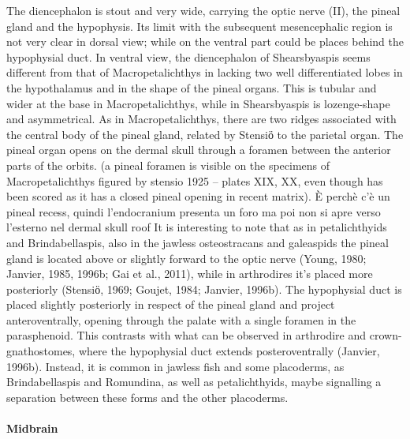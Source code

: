 \documentclass[12pt,letterpaper]{article}
\begin{document}
The diencephalon is stout and very wide, carrying the optic nerve (II), the pineal gland and the hypophysis. Its limit with the subsequent mesencephalic region is not very clear in dorsal view; while on the ventral part could be places behind the hypophysial duct. In ventral view, the diencephalon of Shearsbyaspis seems different from that of Macropetalichthys in lacking two well differentiated lobes in the hypothalamus and in the shape of the pineal organs. This is tubular and wider at the base in Macropetalichthys, while in Shearsbyaspis is lozenge-shape and asymmetrical. As in Macropetalichthys, there are two ridges associated with the central body of the pineal gland, related by Stensiӧ to the parietal organ. The pineal organ opens on the dermal skull through a foramen between the anterior parts of the orbits. (a pineal foramen is visible on the specimens of Macropetalichthys figured by stensio 1925 – plates XIX, XX, even though has been scored as it has a closed pineal opening in recent matrix). È perchè c’è un pineal recess, quindi l’endocranium presenta un foro ma poi non si apre verso l’esterno nel dermal skull roof It is interesting to note that as in petalichthyids and Brindabellaspis, also in the jawless osteostracans and galeaspids the pineal gland is located above or slightly forward to the optic nerve (Young, 1980; Janvier, 1985, 1996b; Gai et al., 2011), while in arthrodires it’s placed more posteriorly (Stensiӧ, 1969; Goujet, 1984; Janvier, 1996b).
The hypophysial duct is placed slightly posteriorly in respect of the pineal gland and project anteroventrally, opening through the palate with a single foramen in the parasphenoid. This contrasts with what can be observed in arthrodire and crown-gnathostomes, where the hypophysial duct extends posteroventrally (Janvier, 1996b). Instead, it is common in jawless fish and some placoderms, as Brindabellaspis and Romundina, as well as petalichthyids, maybe signalling a separation between these forms and the other placoderms.

\paragraph{Midbrain}
\end{document}
